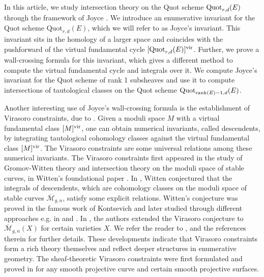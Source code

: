 \documentclass[11pt]{amsart}
\theoremstyle{remark}
\newcommand{\mc}[1]{\mathcal{#1}}
\newcommand{\rk}{\textnormal{rank}}
\newcommand{\quot}[0]{\textnormal{Quot}}
\newcommand{\vir}[0]{\textnormal{vir}}
\numberwithin{theorem}{section}
\begin{document}
    In this article, we study intersection theory on the Quot scheme
    $\quot_{r,d}(E)$ through the framework of Joyce \cite{Joy21}.
    We introduce an enumerative invariant for the Quot scheme $\text{Quot}_{r,d}(E)$, which we will refer to as Joyce's invariant.
    This invariant sits in the homology of a larger space
    and coincides with the pushforward of the virtual fundamental cycle $[\quot_{r,d}(E)]^\vir$.
    Further, we prove a wall-crossing formula for this invariant,
    which gives a different method to compute the virtual fundamental cycle and integrals over it.
    We compute Joyce's invariant for the Quot scheme of rank 1 subsheaves and use it to compute intersections of tautological classes on the Quot scheme $\quot_{\rk(E)-1,d}(E)$.
    
    Another interesting use of Joyce's wall-crossing formula is the establishment of Virasoro constraints, due to \cite{BLM24}.
    Given a moduli space $M$
    with a virtual fundamental class $[M]^\vir$,
    one can obtain numerical invariants, called descendents, by integrating tautological cohomology classes against the virtual fundamental class $[M]^\vir$.
    The Virasoro constraints are some universal relations among these numerical invariants.
    The Virasoro constraints first appeared in the study of 
    Gromov-Witten theory and intersection theory on the moduli space of stable curves, in Witten’s foundational paper \cite{Wit90}.
    In \cite{Wit90}, Witten conjectured that the integrals of descendents, which are cohomology classes on the moduli space of stable curves $\overline{\mc M}_{g,n}$, satisfy some explicit relations. 
    Witten's conjecture was proved in the famous work of Kontsevich \cite{Kon92} and later studied through different approaches e.g. in \cite{OP09} and \cite{Mir07}.
    In \cite{EHX97}, the authors extended the Virasoro conjecture to $\overline{\mc M}_{g,n}(X)$ for certain varieties $X$.
    We refer the reader to \cite{BLM24}, \cite{Boj24} and the references therein for further details. 
    These developments indicate that Virasoro constraints form a rich theory themselves and reflect deeper structures in enumerative geometry.
    The sheaf-theoretic Virasoro constraints were first formulated and proved in \cite{BLM24} for any smooth projective curve and certain smooth projective surfaces.
\end{document}
